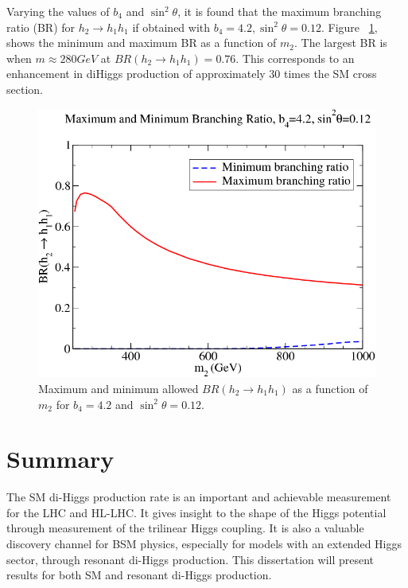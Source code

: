 \indent Varying the values of ${b_{4}}$ and ${\sin^{2}{\theta}}$, it is found that the maximum branching ratio (BR) for ${h_{2}\rightarrow h_{1}h_{1}}$ if obtained with ${b_{4} = 4.2, \sin^{2}\theta = 0.12}$. Figure ~\ref{fig:Ian6}, shows the minimum and maximum BR as a function of ${m_{2}}$. The largest BR is when ${m \approx 280 GeV}$ at ${BR(h_{2}\rightarrow h_{1}h_{1}) = 0.76}$. This corresponds to an enhancement in diHiggs production of approximately 30 times the SM cross section.

\begin{figure}[h]
\begin{center}
\includegraphics[scale=0.5]{figures/Ian6}
\caption[Allowed branching ratios for resonant di-Higgs production]{Maximum and minimum allowed ${BR(h_{2}\rightarrow h_{1}h_{1})}$ as a function of ${m_{2}}$ for ${b_{4} = 4.2}$ and ${\sin^{2}{\theta} = 0.12}$.}
\label{fig:Ian6}
\end{center}
\end{figure}

\section{Summary}
The SM di-Higgs production rate is an important and achievable measurement for the LHC and HL-LHC. It gives insight to the shape of the Higgs potential through measurement of the trilinear Higgs coupling. It is also a valuable discovery channel for BSM physics, especially for models with an extended Higgs sector, through resonant di-Higgs production. This dissertation will present results for both SM and resonant di-Higgs production.